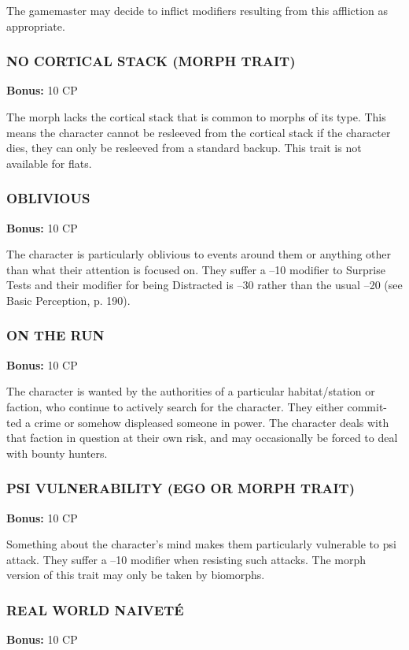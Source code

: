 The gamemaster may decide to inflict modifiers
resulting from this affliction as appropriate.

\subsubsection{NO CORTICAL STACK (MORPH TRAIT)}
\textbf{Bonus:} 10 CP

The morph lacks the cortical stack that is common
to morphs of its type. This means the character cannot
be resleeved from the cortical stack if the character
dies, they can only be resleeved from a standard
backup. This trait is not available for flats.

\subsubsection{OBLIVIOUS}
\textbf{Bonus:} 10 CP

The character is particularly oblivious to events
around them or anything other than what their attention is focused on. They suffer a –10 modifier
to Surprise Tests and their modifier for being Distracted is –30 rather than the usual –20 (see Basic
Perception, p. 190).

\subsubsection{ON THE RUN}
\textbf{Bonus:} 10 CP

The character is wanted by the authorities of a
particular habitat/station or faction, who continue to
actively search for the character. They either commit-
ted a crime or somehow displeased someone in power.
The character deals with that faction in question at
their own risk, and may occasionally be forced to deal
with bounty hunters.

\subsubsection{PSI VULNERABILITY (EGO OR MORPH TRAIT)}
\textbf{Bonus:} 10 CP

Something about the character’s mind makes
them particularly vulnerable to psi attack. They
suffer a –10 modifier when resisting such attacks.
The morph version of this trait may only be taken
by biomorphs.

\subsubsection{REAL WORLD NAIVET\'{E}}
\textbf{Bonus:} 10 CP

